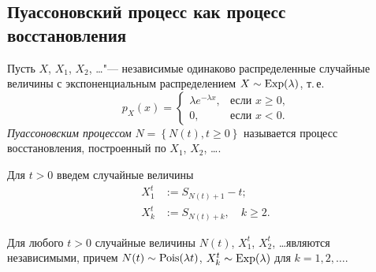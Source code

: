 \subsection{Пуассоновский процесс как процесс восстановления}

\begin{df}
	\sloppy
	Пусть $X$, $X_1$, $X_2$, \ldots	"--- независимые одинаково распределенные случайные величины с экспоненциальным распределением $X\sim \operatorname{\mathrm Exp}(\lambda)$, т.\,е.
	\begin{equation*}
		p_X(x) =
		\begin{cases}
			\lambda e^{- \lambda x}, &\text{если $x \geqslant 0$,}\\
			0, &\text{если $x < 0$}.
		\end{cases}
	\end{equation*}
	\emph{Пуассоновским процессом} $N = \left\{N(t), t\geqslant 0\right\}$ называется процесс восстановления, построенный по $X_1$, $X_2$, \ldots.
\end{df}

Для $t > 0$ введем случайные величины
\begin{align*}
	X_1^t &:= S_{N(t) + 1} - t;\\
	X_k^t &:= S_{N(t) + k},\quad k \geqslant 2.
\end{align*}

\begin{lem}
	\sloppy
	Для любого $t > 0$ случайные величины $N(t)$, $X_1^t$, $X_2^t$, \ldots являются независимыми, причем $N(t) \sim \operatorname{\mathrm Pois}(\lambda t)$, $X_k^t \sim \operatorname{\mathrm Exp}(\lambda)$ для $k = 1, 2, \ldots$.
\end{lem}

